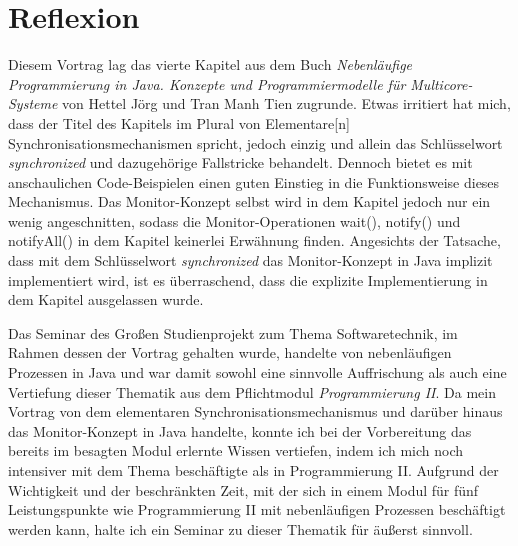 \documentclass[12pt, onecolumn,notitlepage]{scrartcl}
\begin{document}
\section{Reflexion}

Diesem Vortrag lag das vierte Kapitel aus dem Buch \textit{Nebenläufige Programmierung in Java. Konzepte und Programmiermodelle für Multicore-Systeme} von Hettel Jörg und Tran Manh Tien zugrunde. Etwas irritiert hat mich, dass der Titel des Kapitels im Plural von \glqq Elementare[n] Synchronisationsmechanismen\grqq{} spricht, jedoch einzig und allein das Schlüsselwort \textit{synchronized} und dazugehörige Fallstricke behandelt. Dennoch bietet es mit anschaulichen Code-Beispielen einen guten Einstieg in die Funktionsweise dieses Mechanismus. Das Monitor-Konzept selbst wird in dem Kapitel jedoch nur ein wenig angeschnitten, sodass die Monitor-Operationen wait(), notify() und notifyAll() in dem Kapitel keinerlei Erwähnung finden. Angesichts der Tatsache, dass mit dem Schlüsselwort \textit{synchronized} das Monitor-Konzept in Java implizit implementiert wird, ist es überraschend, dass die explizite Implementierung in dem Kapitel ausgelassen wurde.\par
Das Seminar des Großen Studienprojekt zum Thema Softwaretechnik, im Rahmen dessen der Vortrag gehalten wurde, handelte von nebenläufigen Prozessen in Java und war damit sowohl eine sinnvolle Auffrischung als auch eine Vertiefung dieser Thematik aus dem Pflichtmodul \textit{Programmierung II}. Da mein Vortrag von dem elementaren Synchronisationsmechanismus und darüber hinaus das Monitor-Konzept in Java handelte, konnte ich bei der Vorbereitung das bereits im besagten Modul erlernte Wissen vertiefen, indem ich mich noch intensiver mit dem Thema beschäftigte als in Programmierung II. Aufgrund der Wichtigkeit und der beschränkten Zeit, mit der sich in einem Modul für fünf Leistungspunkte wie Programmierung II mit nebenläufigen Prozessen beschäftigt werden kann, halte ich ein Seminar zu dieser Thematik für äußerst sinnvoll. 



\nocite{*}

\end{document}
